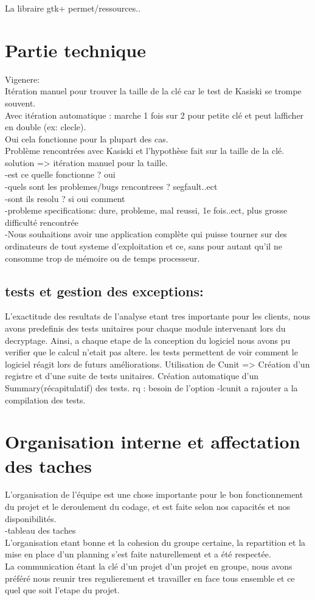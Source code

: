 \documentclass[a4]{article}
\begin{document}
La libraire gtk+ permet/ressources..

	\section{Partie technique}
		Vigenere: \\
		Itération manuel pour trouver la taille de la clé car le test de Kasiski se trompe souvent. \\
		Avec itération automatique : marche 1 fois sur 2 pour petite clé et peut lafficher en double (ex: clecle). \\
		Oui cela fonctionne pour la plupart des cas.\\
		Problème rencontrées avec Kasiski et l'hypothèse fait sur la taille de la clé.
		solution => itération manuel pour la taille. \\
		
		-est ce quelle fonctionne ? oui \\
		-quels sont les problemes/bugs rencontrees ? segfault..ect  \\
		-sont ils resolu ? si oui comment  \\
		-probleme specifications: dure, probleme, mal reussi, 1e fois..ect, plus grosse difficulté rencontrée  \\
		-Nous souhaitions avoir une application complète qui puisse tourner sur des ordinateurs 
de tout systeme d'exploitation et ce, sans pour autant qu’il ne
consomme trop de mémoire ou de temps processeur. 
		\subsection{tests et gestion des exceptions:}
		L’exactitude des resultats de l'analyse etant tres importante pour les clients, nous avons predefinis des tests
unitaires pour chaque module intervenant lors du decryptage. Ainsi, a chaque etape de la conception du logiciel
nous avons pu verifier que le calcul n’etait pas altere. 
		les tests permettent de voir comment le logiciel réagit lors de futurs améliorations.
		Utilisation de Cunit => Création d'un registre et d'une suite de tests unitaires.
		Création automatique d'un Summary(récapitulatif) des tests.
		rq : besoin de l'option -lcunit a rajouter a la compilation des tests.  
		
	\section{Organisation interne et affectation des taches}
	L'organisation de l'équipe est une chose importante pour le bon fonctionnement du
projet et le deroulement du codage, et est faite selon nos capacités et nos disponibilités.  \\
		-tableau des taches  \\
		L'organisation etant bonne et la cohesion du groupe certaine, la repartition et la mise en place d'un planning s'est faite naturellement et a été respectée.  \\
		La communication étant la clé d'un projet d'un projet en groupe, nous avons préféré nous reunir tres regulierement et travailler en face tous ensemble et ce quel que soit l'etape du projet.
\end{document}

